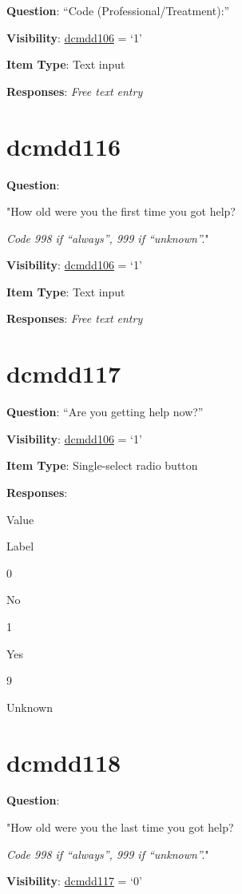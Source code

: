 \documentclass[]{book}
\begin{document}
\textbf{Question}: ``Code (Professional/Treatment):''

\textbf{Visibility}: \protect\hyperlink{dcmdd106}{dcmdd106} = `1'

\textbf{Item Type}: Text input

\textbf{Responses}: \emph{Free text entry}

\hypertarget{dcmdd116}{%
\section{dcmdd116}\label{dcmdd116}}

\textbf{Question}:

"How old were you the first time you got help?

\emph{Code 998 if ``always'', 999 if ``unknown''.}"

\textbf{Visibility}: \protect\hyperlink{dcmdd106}{dcmdd106} = `1'

\textbf{Item Type}: Text input

\textbf{Responses}: \emph{Free text entry}

\hypertarget{dcmdd117}{%
\section{dcmdd117}\label{dcmdd117}}

\textbf{Question}: ``Are you getting help now?''

\textbf{Visibility}: \protect\hyperlink{dcmdd106}{dcmdd106} = `1'

\textbf{Item Type}: Single-select radio button

\textbf{Responses}:

Value

Label

0

No

1

Yes

9

Unknown

\hypertarget{dcmdd118}{%
\section{dcmdd118}\label{dcmdd118}}

\textbf{Question}:

"How old were you the last time you got help?

\emph{Code 998 if ``always'', 999 if ``unknown''.}"

\textbf{Visibility}: \protect\hyperlink{dcmdd117}{dcmdd117} = `0'
\end{document}
